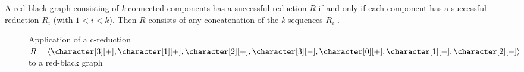 A red-black graph consisting of \textit{k} connected components has a successful reduction $R$ if and only if each component has a successful reduction $R_{i}$ (with $1 < i < k$). Then $R$ consists of any concatenation of the \textit{k} sequences $R_{i}$ \cite{PPPptime2016}.

\begin{figure}[hp]
  

  \caption{Application of a c-reduction $R = \langle \character[3][+], \character[1][+], \character[2][+], \character[3][-], \character[0][+], \character[1][-], \character[2][-] \rangle$ to a red-black graph \grb{}}\label{figure:3}
\end{figure}

\pagebreak
